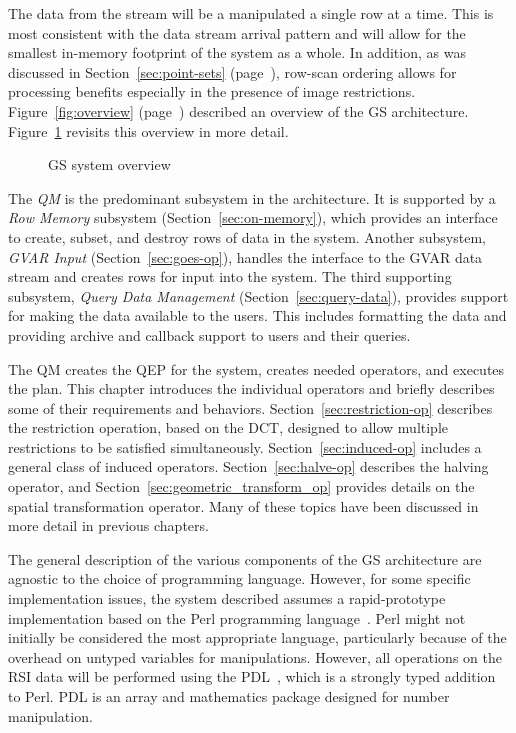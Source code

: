 \documentclass{ucdthesis}       %
\begin{document}
The data from the stream will be a manipulated a single row at a time.
This is most consistent with the data stream arrival pattern and will
allow for the smallest in-memory footprint of the system as a whole.
In addition, as was discussed in Section~\ref{sec:point-sets}
(page~\pageref{sec:point-sets}), row-scan ordering allows for
processing benefits especially in the presence of image restrictions.
Figure~\ref{fig:overview} (page~\pageref{fig:overview}) described an
overview of the \ac{GS} architecture.
Figure~\ref{fig:overview-detail} revisits this overview in more
detail.
%
\begin{figure}[htb]
  \centering
  \scalebox{0.7}{}
  \caption{\ac{GS} system overview}
  \label{fig:overview-detail}
\end{figure}
%
The \emph{\acf{QM}} is the predominant subsystem in the architecture.
It is supported by a \emph{Row Memory} subsystem
(Section~\ref{sec:on-memory}), which provides an interface to create,
subset, and destroy rows of data in the system.  Another subsystem,
\emph{\ac{GVAR} Input} (Section~\ref{sec:goes-op}), handles the
interface to the \ac{GVAR} data stream and creates rows for input into
the system.  The third supporting subsystem, \emph{Query Data
  Management} (Section~\ref{sec:query-data}), provides support for
making the data available to the users.  This includes formatting the
data and providing archive and callback support to users and their
queries.

The \ac{QM} creates the \ac{QEP} for the system, creates needed
operators, and executes the plan.  This chapter introduces the
individual operators and briefly describes some of their requirements
and behaviors.  Section~\ref{sec:restriction-op} describes the
restriction operation, based on the \ac{DCT}, designed to allow
multiple restrictions to be satisfied
simultaneously. Section~\ref{sec:induced-op} includes a general class
of induced operators. Section~\ref{sec:halve-op} describes the halving
operator, and Section~\ref{sec:geometric_transform_op} provides
details on the spatial transformation operator.  Many of these topics
have been discussed in more detail in previous chapters.


The general description of the various components of the \ac{GS}
architecture are agnostic to the choice of programming language.
However, for some specific implementation issues, the system described
assumes a rapid-prototype implementation based on the Perl programming
language~\cite{conway00objec-orien-perl}.  Perl might not initially be
considered the most appropriate language, particularly because of the
overhead on untyped variables for manipulations.  However, all
operations on the \ac{RSI} data will be performed using the
\ac{PDL}~\cite{glazebrook97pdl}, which is a strongly typed addition to
Perl.  \ac{PDL} is an array and mathematics package designed for
number manipulation.
\end{document}
